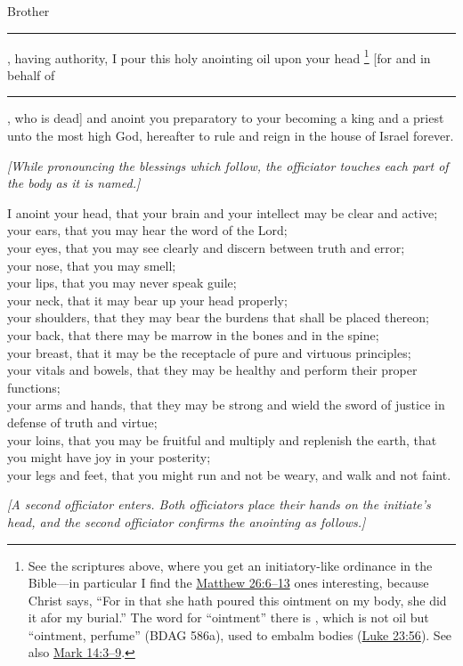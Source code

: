 			Brother \rule{1cm}{0.15mm}, having authority, I pour this holy anointing oil upon your head%
				\footnote{%
					See the scriptures above, where you get an initiatory-like ordinance in the Bible---in particular I find the \hyperref[MATTHEW-26-6]{Matthew 26:6--13} ones interesting, because Christ says, ``For in that she hath poured this ointment on my body, she did it afor my burial.'' The word for ``ointment'' there is , which is not oil but ``ointment, perfume'' (BDAG 586a), used to embalm bodies (\hyperref[LUKE-23-56]{Luke 23:56}). See also \hyperref[MARK-14-3]{Mark 14:3--9}.
					}
			[for and in behalf of \rule{1cm}{0.15mm}, who is dead] and anoint you preparatory to your becoming a king and a priest unto the most high God, hereafter to rule and reign in the house of Israel forever.
			
			\textit{[While pronouncing the blessings which follow, the officiator touches each part of the body as it is named.]}
			
			\noindent I anoint your head, that your brain and your intellect may be clear and active;\\
			your ears, that you may hear the word of the Lord;\\
			your eyes, that you may see clearly and discern between truth and error;\\
			your nose, that you may smell;\\
			your lips, that you may never speak guile;\\
			your neck, that it may bear up your head properly;\\
			your shoulders, that they may bear the burdens that shall be placed thereon;\\
			your back, that there may be marrow in the bones and in the spine;\\
			your breast, that it may be the receptacle of pure and virtuous principles;\\
			your vitals and bowels, that they may be healthy and perform their proper functions;\\
			your arms and hands, that they may be strong and wield the sword of justice
			in defense of truth and virtue;\\
			your loins, that you may be fruitful and multiply and replenish the earth,
			that you might have joy in your posterity;\\
			your legs and feet, that you might run and not be weary, and walk and not faint.
			
			\textit{[A second officiator enters. Both officiators place their hands on the initiate's head, and the second officiator confirms the anointing as follows.]}
			
